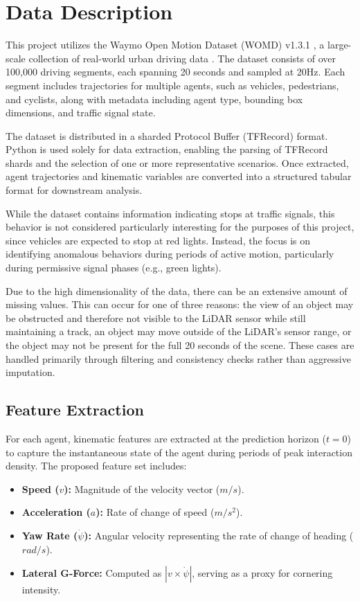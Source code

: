 \documentclass[conference]{IEEEtran}
\begin{document}
\section{Data Description}
This project utilizes the Waymo Open Motion Dataset (WOMD) v1.3.1 \cite{waymo_motion_dataset}, a large-scale collection of real-world urban driving data \cite{sun2020scalability}. The dataset consists of over 100,000 driving segments, each spanning 20 seconds and sampled at 20Hz. Each segment includes trajectories for multiple agents, such as vehicles, pedestrians, and cyclists, along with metadata including agent type, bounding box dimensions, and traffic signal state.

The dataset is distributed in a sharded Protocol Buffer (TFRecord) format. Python is used solely for data extraction, enabling the parsing of TFRecord shards and the selection of one or more representative scenarios. Once extracted, agent trajectories and kinematic variables are converted into a structured tabular format for downstream analysis.

While the dataset contains information indicating stops at traffic signals, this behavior is not considered particularly interesting for the purposes of this project, since vehicles are expected to stop at red lights. Instead, the focus is on identifying anomalous behaviors during periods of active motion, particularly during permissive signal phases (e.g., green lights).

Due to the high dimensionality of the data, there can be an extensive amount of missing values. This can occur for one of three reasons: the view of an object may be obstructed and therefore not visible to the LiDAR sensor while still maintaining a track, an object may move outside of the LiDAR’s sensor range, or the object may not be present for the full 20 seconds of the scene. These cases are handled primarily through filtering and consistency checks rather than aggressive imputation.

\subsection{Feature Extraction}
For each agent, kinematic features are extracted at the prediction horizon ($t = 0$) to capture the instantaneous state of the agent during periods of peak interaction density. The proposed feature set includes:
\begin{itemize}
    \item \textbf{Speed ($v$):} Magnitude of the velocity vector ($m/s$).
    \item \textbf{Acceleration ($a$):} Rate of change of speed ($m/s^2$).
    \item \textbf{Yaw Rate ($\dot{\psi}$):} Angular velocity representing the rate of change of heading ($rad/s$).
    \item \textbf{Lateral G-Force:} Computed as $|v \times \dot{\psi}|$, serving as a proxy for cornering intensity.
\end{itemize}
\end{document}

